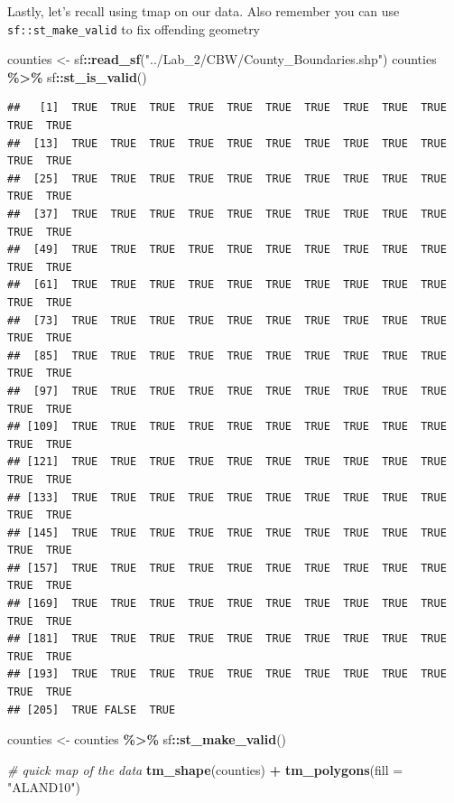 \documentclass[
]{article}
\newenvironment{Shaded}{\begin{snugshade}}{\end{snugshade}}
\newcommand{\AttributeTok}[1]{\textcolor[rgb]{0.13,0.29,0.53}{#1}}
\newcommand{\CommentTok}[1]{\textcolor[rgb]{0.56,0.35,0.01}{\textit{#1}}}
\newcommand{\FunctionTok}[1]{\textcolor[rgb]{0.13,0.29,0.53}{\textbf{#1}}}
\newcommand{\NormalTok}[1]{#1}
\newcommand{\OtherTok}[1]{\textcolor[rgb]{0.56,0.35,0.01}{#1}}
\newcommand{\SpecialCharTok}[1]{\textcolor[rgb]{0.81,0.36,0.00}{\textbf{#1}}}
\newcommand{\StringTok}[1]{\textcolor[rgb]{0.31,0.60,0.02}{#1}}
\begin{document}
Lastly, let's recall using tmap on our data. Also remember you can use
\texttt{sf::st\_make\_valid} to fix offending geometry

\begin{Shaded}
\begin{Highlighting}[]
\NormalTok{counties }\OtherTok{\textless{}{-}}\NormalTok{ sf}\SpecialCharTok{::}\FunctionTok{read\_sf}\NormalTok{(}\StringTok{"../Lab\_2/CBW/County\_Boundaries.shp"}\NormalTok{)}
\NormalTok{counties }\SpecialCharTok{\%\textgreater{}\%}\NormalTok{ sf}\SpecialCharTok{::}\FunctionTok{st\_is\_valid}\NormalTok{()}
\end{Highlighting}
\end{Shaded}

\begin{verbatim}
##   [1]  TRUE  TRUE  TRUE  TRUE  TRUE  TRUE  TRUE  TRUE  TRUE  TRUE  TRUE  TRUE
##  [13]  TRUE  TRUE  TRUE  TRUE  TRUE  TRUE  TRUE  TRUE  TRUE  TRUE  TRUE  TRUE
##  [25]  TRUE  TRUE  TRUE  TRUE  TRUE  TRUE  TRUE  TRUE  TRUE  TRUE  TRUE  TRUE
##  [37]  TRUE  TRUE  TRUE  TRUE  TRUE  TRUE  TRUE  TRUE  TRUE  TRUE  TRUE  TRUE
##  [49]  TRUE  TRUE  TRUE  TRUE  TRUE  TRUE  TRUE  TRUE  TRUE  TRUE  TRUE  TRUE
##  [61]  TRUE  TRUE  TRUE  TRUE  TRUE  TRUE  TRUE  TRUE  TRUE  TRUE  TRUE  TRUE
##  [73]  TRUE  TRUE  TRUE  TRUE  TRUE  TRUE  TRUE  TRUE  TRUE  TRUE  TRUE  TRUE
##  [85]  TRUE  TRUE  TRUE  TRUE  TRUE  TRUE  TRUE  TRUE  TRUE  TRUE  TRUE  TRUE
##  [97]  TRUE  TRUE  TRUE  TRUE  TRUE  TRUE  TRUE  TRUE  TRUE  TRUE  TRUE  TRUE
## [109]  TRUE  TRUE  TRUE  TRUE  TRUE  TRUE  TRUE  TRUE  TRUE  TRUE  TRUE  TRUE
## [121]  TRUE  TRUE  TRUE  TRUE  TRUE  TRUE  TRUE  TRUE  TRUE  TRUE  TRUE  TRUE
## [133]  TRUE  TRUE  TRUE  TRUE  TRUE  TRUE  TRUE  TRUE  TRUE  TRUE  TRUE  TRUE
## [145]  TRUE  TRUE  TRUE  TRUE  TRUE  TRUE  TRUE  TRUE  TRUE  TRUE  TRUE  TRUE
## [157]  TRUE  TRUE  TRUE  TRUE  TRUE  TRUE  TRUE  TRUE  TRUE  TRUE  TRUE  TRUE
## [169]  TRUE  TRUE  TRUE  TRUE  TRUE  TRUE  TRUE  TRUE  TRUE  TRUE  TRUE  TRUE
## [181]  TRUE  TRUE  TRUE  TRUE  TRUE  TRUE  TRUE  TRUE  TRUE  TRUE  TRUE  TRUE
## [193]  TRUE  TRUE  TRUE  TRUE  TRUE  TRUE  TRUE  TRUE  TRUE  TRUE  TRUE  TRUE
## [205]  TRUE FALSE  TRUE
\end{verbatim}

\begin{Shaded}
\begin{Highlighting}[]
\NormalTok{counties }\OtherTok{\textless{}{-}}\NormalTok{ counties }\SpecialCharTok{\%\textgreater{}\%}\NormalTok{ sf}\SpecialCharTok{::}\FunctionTok{st\_make\_valid}\NormalTok{()}

\CommentTok{\# quick map of the data}
\FunctionTok{tm\_shape}\NormalTok{(counties) }\SpecialCharTok{+} \FunctionTok{tm\_polygons}\NormalTok{(}\AttributeTok{fill =} \StringTok{"ALAND10"}\NormalTok{)}
\end{Highlighting}
\end{Shaded}
\end{document}
